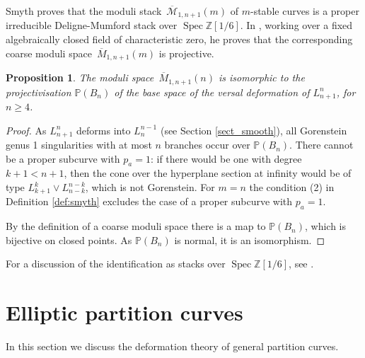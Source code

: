 \documentclass[12pt,a4paper]{amsart}  %
\renewcommand{\P}{\mathbb{P}}
\newcommand{\Z}{\mathbb{Z}}
\DeclareMathOperator{\Spec}{Spec}
\newcommand{\olsi}[1]{\,\overline{\!{#1}}}
\newtheorem{prop}[thm]{Proposition}
\theoremstyle{definition}
\theoremstyle{remark}
\begin{document}
Smyth proves that the moduli stack $\olsi{\mathcal M}_{1,n+1}(m)$ of $m$-stable curves is
a proper irreducible Deligne-Mumford stack over $\Spec \Z[1/6]$. 
In \cite{Sm}, working over a fixed algebraically closed field of characteristic zero, he proves 
that the corresponding coarse moduli space $\olsi{M}_{1,n+1}(m)$ 
is projective.

\begin{prop}
The moduli space  $\olsi{M}_{1,n+1}(n)$ is isomorphic to the
projectivisation $\P(B_n)$ of the base space of the versal deformation of $L^n_{n+1}$,
for $n\geq 4$.
\end{prop}

\begin{proof}
As $L_{n+1}^n$ deforms into $L_n^{n-1}$ (see Section \ref{sect_smooth}), all 
Gorenstein genus 1 singularities with at most $n$ branches occur over  $\P(B_n)$.
There cannot be a  proper subcurve with $p_a=1$: if there would be one with
degree $k+1<n+1$, then the cone over the hyperplane section at infinity would
be of type $L_{k+1}^k\vee L_{n-k}^{n-k}$, which is not Gorenstein. For $m=n$ the 
condition (2) in Definition \ref{def:smyth} excludes the case of a proper subcurve
with $p_a=1$.

By the definition of a coarse moduli space there is a map to $\P(B_n)$, which is
bijective on closed points. As  $\P(B_n)$ is normal, it is an isomorphism.
\end{proof}

For a discussion of the identification as stacks over $\Spec \Z[1/6]$, see \cite{LP}.

\section{Elliptic partition curves}
In this section we discuss the deformation theory of general 
partition curves.
\end{document}
